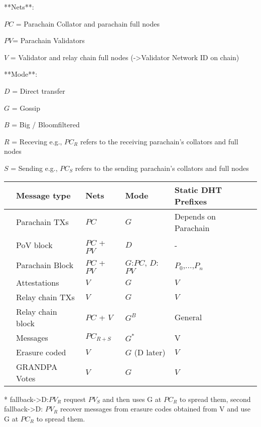 **Nets**:

$PC$ = Parachain Collator and parachain full nodes

$PV$= Parachain Validators

$V$ = Validator and relay chain full nodes (->Validator Network ID on chain)

**Mode**:

$D$ = Direct transfer

$G$ = Gossip

$B$ = Big / Bloomfiltered

$R$ = Receving e.g., $PC_{R}$ refers to the receiving parachain's collators and full nodes

$S$ = Sending e.g., $PC_{S}$ refers to the sending parachain's collators and full nodes

\begin{table}[h]
\begin{tabular}{lllll}
& \textbf{Message type}  & \textbf{Nets}  & \textbf{Mode}  & \textbf{Static DHT Prefixes} \\
\hline
& Parachain TXs  & $PC$   & $G$   &Depends on Parachain\\
& PoV block  & $PC$ + $PV$  & $D$         & - \\
& Parachain Block & $PC$ + $PV$   & $G$:$PC$, $D$:$PV$ &$P_0$,...,$P_n$\\
& Attestations   & $V$   & $G$  & $V$ \\
& Relay chain TXs & $V$    & $G$   & $V$ \\
& Relay chain block & $PC$ + $V$  & $G^B$   & General \\
& Messages  & $PC_{R + S}$ & $G^*$     & V \\
& Erasure coded    & $V$           & $G$ (D later)        &$V$\\
& GRANDPA Votes   &$V$          & $G$      &$V$\\
\end{tabular}
\end{table}

* fallback->D:$PV_{R}$ request $PV_{S}$ and then uses G at $PC_{R}$ to spread them,
second fallback->D: $PV_{R}$ recover messages from erasure codes obtained from V and use G at $PC_{R}$ to spread them.
